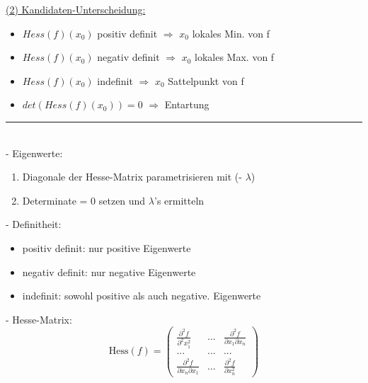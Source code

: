 \documentclass[6pt]{article}
\begin{document}
\begin{multicols*}{3}
	\vspace{3mm}
	\underline{(2) Kandidaten-Unterscheidung:} 
	\begin{itemize}[itemsep=2pt, parsep=2pt]
		\item $Hess(f)(x_0)$ positiv definit $\Rightarrow$ $x_0$	lokales Min. von f
		\item $Hess(f)(x_0)$ negativ definit  $\Rightarrow$ $x_0$ lokales Max. von f
		\item $Hess(f)(x_0)$ indefinit $\Rightarrow$ $x_0$	Sattelpunkt von  f
		\item $ det(Hess(f)(x_0))=0 $ $\Rightarrow$ Entartung 
	\end{itemize}
	
	\vspace{-2mm}
  	\noindent\textcolor{gray}{\rule{9cm}{0.1pt}}
	\vspace{-2mm}\\
	
	- Eigenwerte: 
	\begin{enumerate}[label=(\roman*), itemsep=2pt, parsep=2pt]
		\item 	Diagonale der Hesse-Matrix parametrisieren mit (- $\lambda$)
		\item 	Determinate = 0 setzen und $\lambda$'s ermitteln 

	\end{enumerate}

	
	- Definitheit: 
	\begin{itemize}[itemsep=2pt, parsep=2pt]
			\item positiv definit:	  nur positive Eigenwerte
			\item negativ definit:   nur negative Eigenwerte
			\item indefinit:	 sowohl positive als auch negative. Eigenwerte
	\end{itemize}


	\vspace{2mm}
	- Hesse-Matrix:
	\vspace{2mm}
	\begin{equation*}
			\text{Hess}(f)=
				\begin{pmatrix}
					\frac{\partial^2 f}{\partial^2x_1^2} & ... & \frac{\partial^2 f}{\partial x_1 \partial x_n}\\
					...&...&...\\
					\frac{\partial^2 f}{\partial x_n \partial x_1} & ... & \frac{\partial^2 f}{\partial x_n^2}
				\end{pmatrix}
		\end{equation*}


\end{multicols*}
\end{document}
